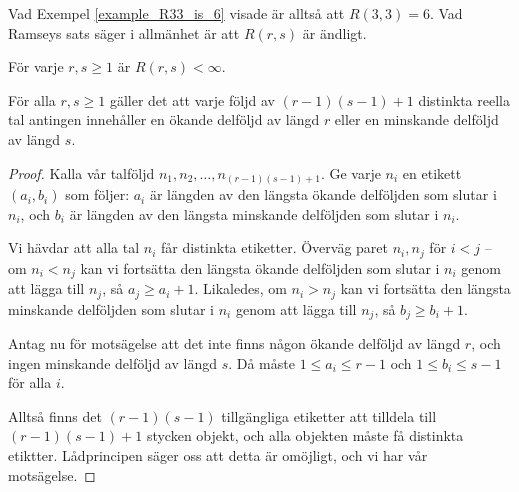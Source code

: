\documentclass[nobib]{tufte-handout}
\begin{document}
Vad Exempel \ref{example_R33_is_6} visade är alltså att $R(3,3) = 6$. Vad Ramseys sats säger i allmänhet är att $R(r,s)$ är ändligt.

\begin{theorem}\label{ramseys_theorem}
  För varje $r, s \geq 1$ är $R(r,s) < \infty$.
\end{theorem}

\begin{theorem}
  För alla $r,s \geq 1$ gäller det att varje följd av $(r-1)(s-1) + 1$ distinkta reella tal antingen innehåller en ökande delföljd av längd $r$ eller en minskande delföljd av längd $s$.

  \begin{proof}
    Kalla vår talföljd $n_1, n_2, \ldots, n_{(r-1)(s-1)+1}$. Ge varje $n_i$ en etikett $(a_i, b_i)$ som följer: $a_i$ är längden av den längsta ökande delföljden som slutar i $n_i$, och $b_i$ är längden av den längsta minskande delföljden som slutar i $n_i$.

    Vi hävdar att alla tal $n_i$ får distinkta etiketter. Överväg paret $n_i, n_j$ för $i < j$ -- om $n_i < n_j$ kan vi fortsätta den längsta ökande delföljden som slutar i $n_i$ genom att lägga till $n_j$, så $a_j \geq a_i + 1$. Likaledes, om $n_i > n_j$ kan vi fortsätta den längsta minskande delföljden som slutar i $n_i$ genom att lägga till $n_j$, så $b_j \geq b_i + 1$.

    Antag nu för motsägelse att det inte finns någon ökande delföljd av längd $r$, och ingen minskande delföljd av längd $s$. Då måste $1 \leq a_i \leq r-1$ och $1\leq b_i \leq s-1$ för alla $i$.

    Alltså finns det $(r-1)(s-1)$ tillgängliga etiketter att tilldela till $(r-1)(s-1) + 1$ stycken objekt, och alla objekten måste få distinkta etiktter. Lådprincipen säger oss att detta är omöjligt, och vi har vår motsägelse.
  \end{proof}
\end{theorem}


\newpage
\end{document}
